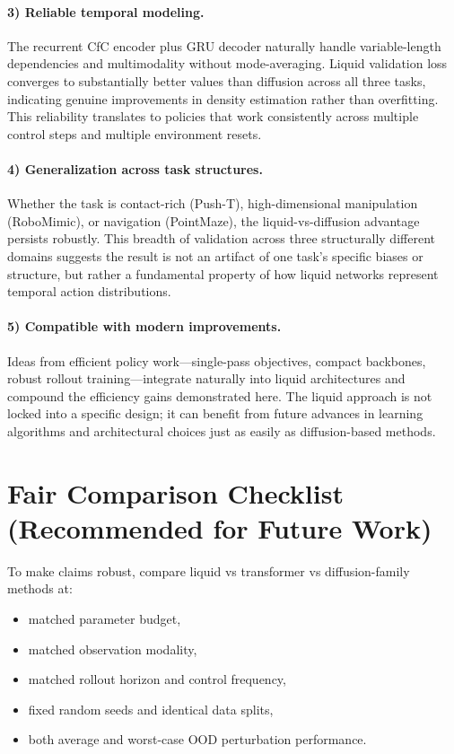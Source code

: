 \documentclass{article}
\begin{document}
\paragraph{3) Reliable temporal modeling.}
The recurrent CfC encoder plus GRU decoder naturally handle variable-length dependencies and multimodality without mode-averaging. Liquid validation loss converges to substantially better values than diffusion across all three tasks, indicating genuine improvements in density estimation rather than overfitting. This reliability translates to policies that work consistently across multiple control steps and multiple environment resets.

\paragraph{4) Generalization across task structures.}
Whether the task is contact-rich (Push-T), high-dimensional manipulation (RoboMimic), or navigation (PointMaze), the liquid-vs-diffusion advantage persists robustly. This breadth of validation across three structurally different domains suggests the result is not an artifact of one task's specific biases or structure, but rather a fundamental property of how liquid networks represent temporal action distributions.

\paragraph{5) Compatible with modern improvements.}
Ideas from efficient policy work---single-pass objectives, compact backbones, robust rollout training---integrate naturally into liquid architectures and compound the efficiency gains demonstrated here. The liquid approach is not locked into a specific design; it can benefit from future advances in learning algorithms and architectural choices just as easily as diffusion-based methods.

\section{Fair Comparison Checklist (Recommended for Future Work)}
To make claims robust, compare liquid vs transformer vs diffusion-family methods at:
\begin{itemize}
    \item matched parameter budget,
    \item matched observation modality,
    \item matched rollout horizon and control frequency,
    \item fixed random seeds and identical data splits,
    \item both average and worst-case OOD perturbation performance.
\end{itemize}
\end{document}

